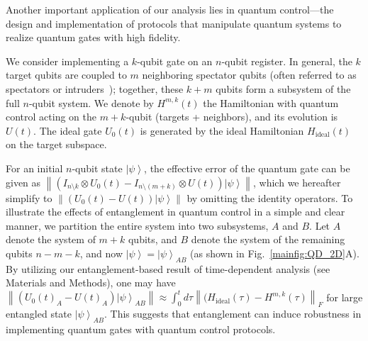 \documentclass[12pt]{article}
\newcommand{\ket}[1]{\left|#1\right\rangle}
\newcommand{\norm}[1]{\left\lVert #1\right\rVert}
\begin{document}
Another important application of our analysis lies in quantum control---the design and implementation of protocols that manipulate quantum systems to realize quantum gates with high fidelity. 

We consider implementing a $k$-qubit gate on an $n$-qubit register. In general, the $k$ target qubits are coupled to $m$ neighboring spectator qubits (often referred to as spectators or intruders~\cite{ni2022scalable}); together, these $k + m$ qubits form a subsystem of the full $n$-qubit system.
We denote by $H^{m,k}(t)$ the Hamiltonian with quantum control acting on the $m+k$-qubit (targets + neighbors), and its evolution is $U(t)$. The ideal gate $U_0(t)$ is generated by the ideal Hamiltonian $H_{\text{ideal}}(t)$ on the target subspace.

For an initial $n$-qubit state $\ket{\psi}$, the effective error of the quantum gate can be given as $\norm{(I_{n\setminus k}\otimes U_0(t)-I_{n\setminus (m+k)}\otimes U(t))\ket{\psi}}$, which we hereafter simplify to $\norm{(U_0(t)-U(t))\ket{\psi}}$ by omitting the identity operators.
To illustrate the effects of entanglement in quantum control in a simple and clear manner, we partition the entire system into two subsystems, $A$ and $B$.
Let $A$ denote the system of $m+k$ qubits, and $B$ denote the system of the remaining qubits $n-m-k$, and now 
$\ket{\psi}=\ket{\psi}_{AB}$ (as shown in Fig.~\ref{mainfig:QD_2D}A). 
By utilizing our entanglement-based result of time-dependent analysis (see Materials and Methods), one may have
    $\norm{ (U_0(t)_A-U(t)_A)\ket{\psi}_{AB}} \approx \int_0^t d\tau \norm{(H_{\text{ideal}}(\tau)-H^{m,k}(\tau) }_F$ for large entangled state $\ket{\psi}_{AB}$. 
This suggests that entanglement can induce robustness in implementing quantum gates with quantum control protocols.\\
\end{document}
